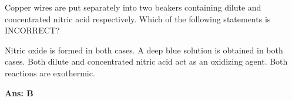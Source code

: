 \documentclass[border=3pt,varwidth=70mm]{standalone}
\begin{document}
Copper wires are put separately into two beakers containing dilute and concentrated nitric acid respectively. Which of the following statements is INCORRECT? 

\begin{choices}
\choice Nitric oxide is formed in both cases.
\choice A deep blue solution is obtained in both cases.
\choice Both dilute and concentrated nitric acid act as an oxidizing agent.
\choice Both reactions are exothermic.
\end{choices}


\begin{answer}
\hrulefill\par
\textbf{Ans: B}

\end{answer}
\end{document}
